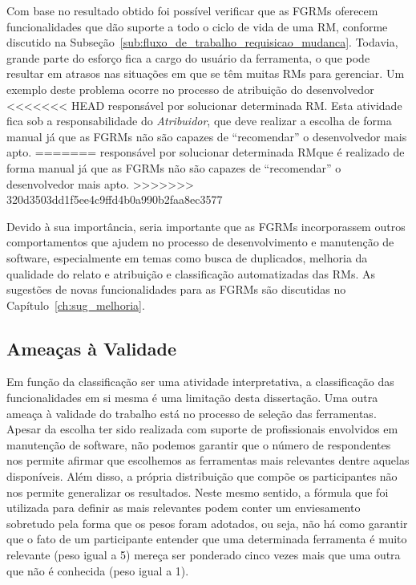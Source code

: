Com base no resultado obtido foi possível verificar que as FGRMs oferecem
funcionalidades que dão suporte a todo o ciclo de vida de uma RM, conforme
discutido na Subseção~\ref{sub:fluxo_de_trabalho_requisicao_mudanca}. Todavia,
grande parte do esforço fica a cargo do usuário da ferramenta, o que pode
resultar em atrasos nas situações em que se têm muitas RMs para gerenciar. Um
exemplo deste problema ocorre no processo de atribuição do desenvolvedor
<<<<<<< HEAD
responsável por solucionar determinada RM\@. Esta atividade fica sob a
responsabilidade do \textit{Atribuidor}, que deve realizar a escolha de forma
manual já que as FGRMs não são capazes de ``recomendar'' o desenvolvedor mais
apto.
=======
responsável por solucionar determinada RM\@ que é realizado de forma manual já
que as FGRMs não são capazes de ``recomendar'' o desenvolvedor mais apto.
>>>>>>> 320d3503dd1f5ee4c9ffd4b0a990b2faa8ec3577

Devido à sua importância, seria importante que as FGRMs incorporassem outros
comportamentos que ajudem no processo de desenvolvimento e manutenção de
software, especialmente em temas como busca de duplicados, melhoria da qualidade
do relato e atribuição e classificação automatizadas das RMs. As sugestões de
novas funcionalidades para as FGRMs são discutidas no
Capítulo~\ref{ch:sug_melhoria}.

\subsection{Ameaças à Validade}
\label{sec:ameacas_a_validade}

Em função da classificação ser uma atividade interpretativa, a classificação
das funcionalidades em si mesma é uma limitação desta dissertação. Uma outra
ameaça à validade do trabalho está no processo de seleção das ferramentas.
Apesar da escolha ter sido realizada com suporte de profissionais envolvidos em
manutenção de software, não podemos garantir que o número de respondentes nos
permite afirmar que escolhemos as ferramentas mais relevantes dentre aquelas
disponíveis. Além disso, a própria distribuição que compõe os participantes não
nos permite generalizar os resultados. Neste mesmo sentido, a fórmula que foi
utilizada para definir as mais relevantes podem conter um enviesamento
sobretudo pela forma que os pesos foram adotados, ou seja, não há como garantir
que o fato de um participante entender que uma determinada ferramenta é muito
relevante (peso igual a 5) mereça ser ponderado cinco vezes mais que uma outra
que não é conhecida (peso igual a 1).

